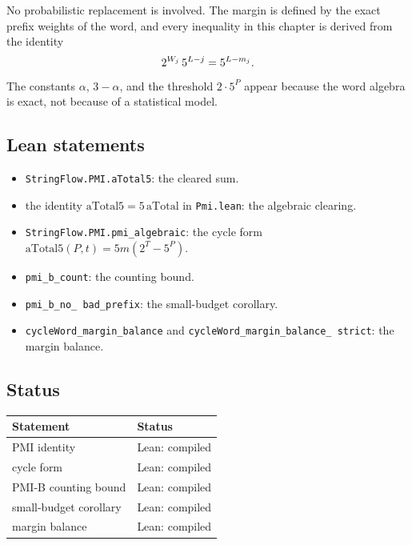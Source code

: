 No probabilistic replacement is involved.  The margin is defined by
the exact prefix weights of the word, and every inequality in this
chapter is derived from the identity
\begin{equation*}
  2^{W_j}\,5^{L-j}=5^{L-m_j}.
\end{equation*}
The constants $\alpha$, $3-\alpha$, and the threshold $2\cdot5^P$
appear because the word algebra is exact, not because of a statistical
model.

\subsection{Lean statements}

\begin{itemize}[leftmargin=*]
\item \texttt{StringFlow.PMI.aTotal5}: the cleared sum.
\item the identity $\mathrm{aTotal5}=5\,\mathrm{aTotal}$ in
  \texttt{Pmi.lean}: the algebraic clearing.
\item \texttt{StringFlow.PMI.pmi\_\allowbreak algebraic}: the cycle form
  $\mathrm{aTotal5}(P,t)=5m(2^T-5^P)$.
\item \texttt{pmi\_\allowbreak b\_\allowbreak count}: the counting
  bound.
\item \texttt{pmi\_\allowbreak b\_\allowbreak no\_\allowbreak
  bad\_\allowbreak prefix}: the small-budget corollary.
\item \texttt{cycleWord\_\allowbreak margin\_\allowbreak balance} and
  \texttt{cycleWord\_\allowbreak margin\_\allowbreak balance\_\allowbreak
  strict}: the margin balance.
\end{itemize}

\subsection{Status}

\begin{center}
\small
\begin{tabular}{@{}ll@{}}
\toprule
Statement & Status \\
\midrule
PMI identity & Lean: compiled \\
cycle form & Lean: compiled \\
PMI-B counting bound & Lean: compiled \\
small-budget corollary & Lean: compiled \\
margin balance & Lean: compiled \\
\bottomrule
\end{tabular}
\end{center}
